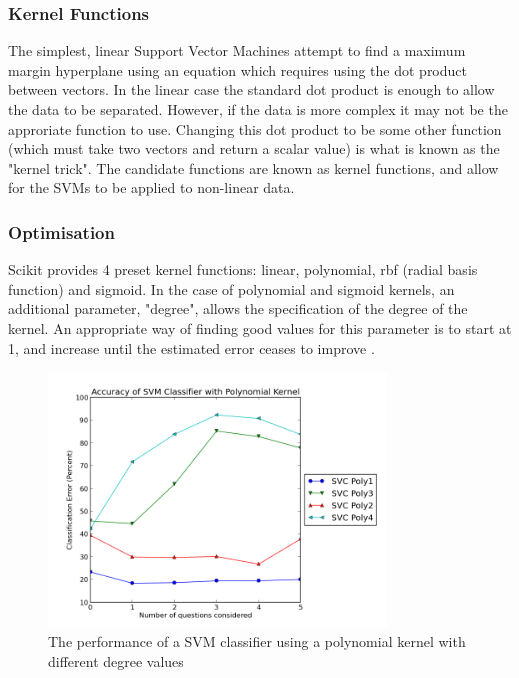 \subsubsection{Kernel Functions}
The simplest, linear Support Vector Machines attempt to find a maximum margin hyperplane using an equation which requires using the dot product between vectors. In the linear case the standard dot product is enough to allow the data to be separated. However, if the data is more complex it may not be the approriate function to use. Changing this dot product to be some other function (which must take two vectors and return a scalar value) is what is known as the "kernel trick". The candidate functions are known as kernel functions, and allow for the SVMs to be applied to non-linear data. 

\subsubsection{Optimisation}
Scikit provides 4 preset kernel functions: linear, polynomial, rbf (radial basis function) and sigmoid. In the case of polynomial and sigmoid kernels, an additional parameter, "degree", allows the specification of the degree of the kernel. An appropriate way of finding good values for this parameter is to start at 1, and increase until the estimated error ceases to improve \cite{witten2011data}. 

\begin{figure}[h!]
\centering
\includegraphics[width=0.8\textwidth]{images/svcpoly.png}
\caption{The performance of a SVM classifier using a polynomial kernel with different degree values}
\label{fig:svcpoly}
\end{figure}

